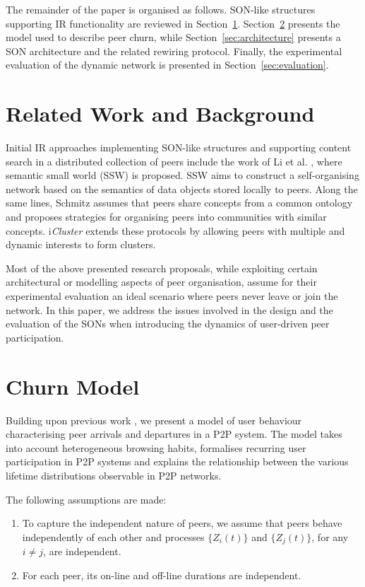 \documentclass{llncs}
\newcommand{\iCluster}{i\textsl{Cluster} }
\begin{document}
The remainder of the paper is organised as follows. SON-like structures supporting IR functionality are reviewed in Section~\ref{sec:related}. Section~\ref{sec:model} presents the model used to describe peer churn, while Section~\ref{sec:architecture} presents a SON architecture and the related rewiring protocol. Finally, the experimental evaluation of the dynamic network is presented in Section~\ref{sec:evaluation}.

\section{Related Work and Background} \label{sec:related}
Initial IR approaches implementing SON-like structures and supporting content search in a distributed collection of peers include the work of  Li et al. \cite{li04semantic}, where semantic small world (SSW) is proposed. SSW aims to construct a self-organising network based on the semantics of data objects stored locally to peers. Along the same lines, Schmitz \cite{schmitz04self} assumes that peers share concepts from a common ontology and proposes strategies for organising peers into communities with similar concepts.
\iCluster \cite{raftopoulou08iCluster} extends these protocols by allowing peers with multiple and dynamic interests to form clusters.

Most of the above presented research proposals, while exploiting certain architectural or modelling aspects of peer organisation, assume for their experimental evaluation an ideal scenario where peers never leave or join the network. In this paper, we address the issues involved in the design and the evaluation of the SONs when introducing the dynamics of user-driven peer participation.


\section{Churn Model} \label{sec:model}
Building upon previous work \cite{yao06modeling,leonard07lifetime,stutzbach06understanding}, we present a model of user behaviour characterising peer arrivals and departures in a P2P system. The model takes into account heterogeneous browsing habits, formalises recurring user participation in P2P systems and explains the relationship between the various lifetime distributions observable in P2P networks.

The following assumptions are made:
\begin{enumerate}
  \item To capture the independent nature of peers, we assume that peers behave independently of each other and processes $\{Z_i(t)\}$ and $\{Z_j(t)\}$, for any $i\neq j$, are independent.
  \item For each peer, its on-line and off-line durations are independent.
\end{enumerate}
\end{document}
